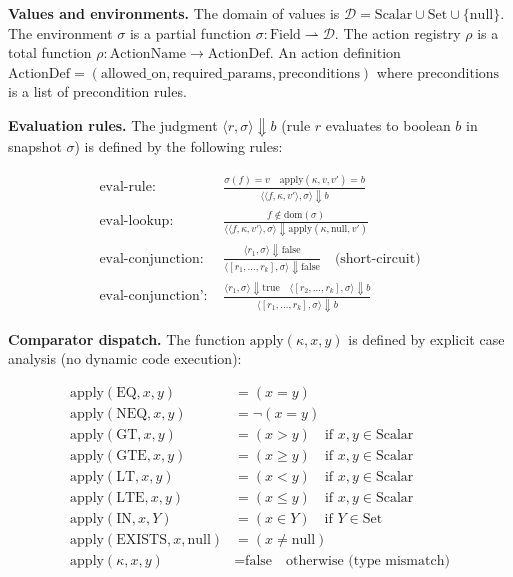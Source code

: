 \textbf{Values and environments.} The domain of values is $\mathcal{D} = \text{Scalar} \cup \text{Set} \cup \{\text{null}\}$. The environment $\sigma$ is a partial function $\sigma: \text{Field} \rightharpoonup \mathcal{D}$. The action registry $\rho$ is a total function $\rho: \text{ActionName} \to \text{ActionDef}$. An action definition $\text{ActionDef} = (\text{allowed\_on}, \text{required\_params}, \text{preconditions})$ where $\text{preconditions}$ is a list of precondition rules.

\textbf{Evaluation rules.} The judgment $\langle r, \sigma \rangle \Downarrow b$ (rule $r$ evaluates to boolean $b$ in snapshot $\sigma$) is defined by the following rules:

\begin{align*}
    \text{eval-rule: } & \frac{\sigma(f) = v \quad \text{apply}(\kappa, v, v') = b}{\langle \langle f, \kappa, v' \rangle, \sigma \rangle \Downarrow b} \\
    \text{eval-lookup: } & \frac{f \notin \text{dom}(\sigma)}{\langle \langle f, \kappa, v' \rangle, \sigma \rangle \Downarrow \text{apply}(\kappa, \text{null}, v')} \\
    \text{eval-conjunction: } & \frac{\langle r_1, \sigma \rangle \Downarrow \text{false}}{\langle [r_1, \ldots, r_k], \sigma \rangle \Downarrow \text{false}} \quad \text{(short-circuit)} \\
    \text{eval-conjunction': } & \frac{\langle r_1, \sigma \rangle \Downarrow \text{true} \quad \langle [r_2, \ldots, r_k], \sigma \rangle \Downarrow b}{\langle [r_1, \ldots, r_k], \sigma \rangle \Downarrow b}
\end{align*}

\textbf{Comparator dispatch.} The function $\text{apply}(\kappa, x, y)$ is defined by explicit case analysis (no dynamic code execution):

\begin{align*}
    \text{apply}(\text{EQ}, x, y) &= (x = y) \\
    \text{apply}(\text{NEQ}, x, y) &= \neg(x = y) \\
    \text{apply}(\text{GT}, x, y) &= (x > y) \quad \text{if } x, y \in \text{Scalar} \\
    \text{apply}(\text{GTE}, x, y) &= (x \geq y) \quad \text{if } x, y \in \text{Scalar} \\
    \text{apply}(\text{LT}, x, y) &= (x < y) \quad \text{if } x, y \in \text{Scalar} \\
    \text{apply}(\text{LTE}, x, y) &= (x \leq y) \quad \text{if } x, y \in \text{Scalar} \\
    \text{apply}(\text{IN}, x, Y) &= (x \in Y) \quad \text{if } Y \in \text{Set} \\
    \text{apply}(\text{EXISTS}, x, \text{null}) &= (x \neq \text{null}) \\
    \text{apply}(\kappa, x, y) &= \text{false} \quad \text{otherwise (type mismatch)}
\end{align*}

